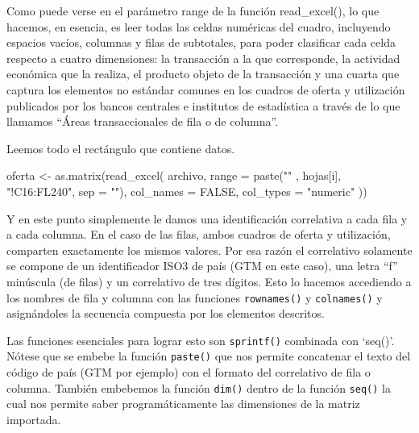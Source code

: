 \documentclass[
]{article}
\newenvironment{Shaded}{\begin{snugshade}}{\end{snugshade}}
\newcommand{\AttributeTok}[1]{\textcolor[rgb]{0.77,0.63,0.00}{#1}}
\newcommand{\ConstantTok}[1]{\textcolor[rgb]{0.00,0.00,0.00}{#1}}
\newcommand{\FunctionTok}[1]{\textcolor[rgb]{0.00,0.00,0.00}{#1}}
\newcommand{\NormalTok}[1]{#1}
\newcommand{\OtherTok}[1]{\textcolor[rgb]{0.56,0.35,0.01}{#1}}
\newcommand{\StringTok}[1]{\textcolor[rgb]{0.31,0.60,0.02}{#1}}
\begin{document}
Como puede verse en el parámetro range de la función read\_excel(), lo
que hacemos, en esencia, es leer todas las celdas numéricas del cuadro,
incluyendo espacios vacíos, columnas y filas de subtotales, para poder
clasificar cada celda respecto a cuatro dimensiones: la transacción a la
que corresponde, la actividad económica que la realiza, el producto
objeto de la transacción y una cuarta que captura los elementos no
estándar comunes en los cuadros de oferta y utilización publicados por
los bancos centrales e institutos de estadística a través de lo que
llamamos ``Áreas transaccionales de fila o de columna''.

Leemos todo el rectángulo que contiene datos.

\begin{Shaded}
\begin{Highlighting}[]
\NormalTok{oferta }\OtherTok{\textless{}{-}} \FunctionTok{as.matrix}\NormalTok{(}\FunctionTok{read\_excel}\NormalTok{(}
\NormalTok{  archivo,}
  \AttributeTok{range =} \FunctionTok{paste}\NormalTok{(}\StringTok{"\textquotesingle{}"}\NormalTok{ , hojas[i], }\StringTok{"\textquotesingle{}!C16:FL240"}\NormalTok{, }\AttributeTok{sep =} \StringTok{""}\NormalTok{),}
  \AttributeTok{col\_names =} \ConstantTok{FALSE}\NormalTok{,}
  \AttributeTok{col\_types =} \StringTok{"numeric"}
\NormalTok{))}
\end{Highlighting}
\end{Shaded}

Y en este punto simplemente le damos una identificación correlativa a
cada fila y a cada columna. En el caso de las filas, ambos cuadros de
oferta y utilización, comparten exactamente los mismos valores. Por esa
razón el correlativo solamente se compone de un identificador ISO3 de
país (GTM en este caso), una letra ``f'' minúscula (de filas) y un
correlativo de tres dígitos. Esto lo hacemos accediendo a los nombres de
fila y columna con las funciones \texttt{rownames()} y
\texttt{colnames()} y asignándoles la secuencia compuesta por los
elementos descritos.

Las funciones esenciales para lograr esto son \texttt{sprintf()}
combinada con `seq()'. Nótese que se embebe la función \texttt{paste()}
que nos permite concatenar el texto del código de país (GTM por ejemplo)
con el formato del correlativo de fila o columna. También embebemos la
función \texttt{dim()} dentro de la función \texttt{seq()} la cual nos
permite saber programáticamente las dimensiones de la matriz importada.
\end{document}
